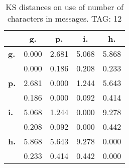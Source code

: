 \begin{table}[h!]
\begin{center}
\begin{tabular}{| l || c | c | c | c |}\hline
 & {\bf g.} & {\bf p.} & {\bf i.} & {\bf h.} \\\hline\hline
{\bf g.} & 0.000 & 2.681 & 5.068 & 5.868 \\
{\bf } & 0.000 & 0.186 & 0.208 & 0.233 \\\hline
{\bf p.} & 2.681 & 0.000 & 1.244 & 5.643 \\
{\bf } & 0.186 & 0.000 & 0.092 & 0.414 \\\hline
{\bf i.} & 5.068 & 1.244 & 0.000 & 9.278 \\
{\bf } & 0.208 & 0.092 & 0.000 & 0.442 \\\hline
{\bf h.} & 5.868 & 5.643 & 9.278 & 0.000 \\
{\bf } & 0.233 & 0.414 & 0.442 & 0.000 \\\hline
\end{tabular}
\caption{KS distances on use of number of characters in messages. TAG: 12}
\end{center}
\end{table}